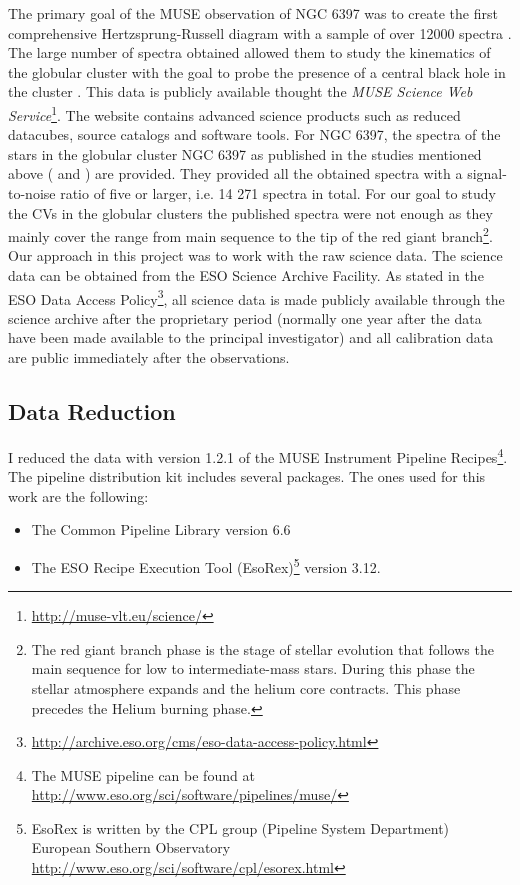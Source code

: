 The primary goal of the MUSE observation of NGC 6397 was to create the first comprehensive Hertzsprung-Russell diagram with a sample of over 12000 spectra \citep{husser_muse_2016}. The large number of spectra obtained allowed them to study the kinematics of the globular cluster with the goal to probe the presence of a central black hole in the cluster \citep{kamann_muse_2016}. This data is publicly available thought the \emph{MUSE Science Web Service}\footnote{\url{http://muse-vlt.eu/science/}}. The website contains advanced science products such as reduced datacubes, source catalogs and software tools. For NGC 6397, the spectra of the stars in the globular cluster NGC 6397 as published in the studies mentioned above (\citealp{husser_muse_2016} and \citealp{kamann_muse_2016}) are provided. They provided all the obtained spectra with a signal-to-noise ratio of five or larger, i.e. 14 271 spectra in total. For our goal to study the CVs in the globular clusters the published spectra were not enough as they mainly cover the range from main sequence to the tip of the red giant branch\footnote{The red giant branch phase is the stage of stellar evolution that follows the main sequence for low to intermediate-mass stars. During this phase the stellar atmosphere expands and the helium core contracts. This phase precedes the Helium burning phase. }. Our approach in this project was to work with the raw science data. The science data can be obtained from the ESO  Science Archive Facility. As stated in the ESO Data Access Policy\footnote{\url{http://archive.eso.org/cms/eso-data-access-policy.html}}, all science data is made publicly available through the science archive after the proprietary period (normally one year after the data have been made available to the principal investigator) and all calibration data are public immediately after the observations.  

\subsection{Data Reduction}

I reduced the data with version 1.2.1 of the MUSE Instrument Pipeline Recipes\footnote{The MUSE pipeline can be found at \url{http://www.eso.org/sci/software/pipelines/muse/}}\citep{weilbacher_design_2012}. The pipeline distribution kit includes several packages. The ones used for this work are the following:

\begin{itemize}
        \item The Common Pipeline Library version 6.6 \citep{mckay_common_2004}
        \item The ESO Recipe Execution Tool (EsoRex)\footnote{EsoRex is written by the CPL group (Pipeline System Department) European Southern Observatory \url{http://www.eso.org/sci/software/cpl/esorex.html}} version 3.12.
\end{itemize}

